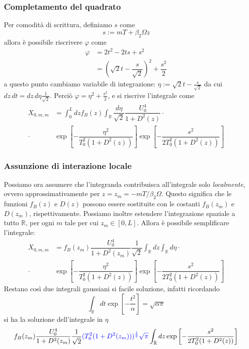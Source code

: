 \documentclass[8pt]{beamer} %
\begin{document}
\begin{frame}
	\frametitle{Completamento del quadrato}
	Per comodità di scrittura, definiamo $s$ come
	\begin{equation*}
		s := mT+\beta_2\Omega z
	\end{equation*}
	allora è possibile riscrivere $\varphi$ come
	\begin{align*}
		\varphi &= 2t^2 - 2ts + s^2 \\
		&= \left(\sqrt{2}t - \dfrac{s}{\sqrt{2}}\right)^2 + \dfrac{s^2}{2}
	\end{align*}
	a questo punto cambiamo variabile di integrazione: $\eta := \sqrt{2}t - \frac{s}{\sqrt{2}}$
	da cui $dz\,dt = dz\,d\eta \frac{1}{\sqrt{2}}$.
	Perciò $\varphi = \eta^2 + \frac{s^2}{2}$, e si riscrive l'integrale come
	\begin{align*}
		X_{0, m, m} &= \int_{0}^{L}dz f_B(z) \int_{\mathbb{R}}\dfrac{d\eta}{\sqrt{2}}
		\dfrac{U_0^4}{1+D^2(z)} \cdot \\ \cdot  &\exp\left[-\dfrac{\eta^2}{T_0^2(1+D^2(z))} \right] \exp\left[-\dfrac{s^2}{2T_0^2(1+D^2(z))} \right]
	\end{align*}
\end{frame}

\begin{frame}
	\frametitle{Assunzione di interazione locale}
	Possiamo ora assumere che l'integranda contribuisca all'integrale solo \emph{localmente}, ovvero approssimativamente per $z=z_m=-mT/\beta_2\Omega$. Questo significa che le funzioni $f_B(z)$ e $D(z)$ possono essere sostituite con le costanti $f_B(z_m)$ e $D(z_m)$, rispettivamente. Possiamo inoltre estendere l'integrazione spaziale a tutto $\mathbb{R}$, per ogni $m$ tale per cui $z_m \in [0, L]$.
	Allora è possibile semplificare l'integrale:
	\begin{align*}
		X_{0, m, m} &= f_B(z_m) \dfrac{U_0^4}{1+D^2(z_m)}  \dfrac{1}{\sqrt{2}}\int_{\mathbb{R}}dz \int_{\mathbb{R}}d\eta
	 \cdot \\ \cdot  &\exp\left[-\dfrac{\eta^2}{T_0^2(1+D^2(z))} \right] \exp\left[-\dfrac{s^2}{2T_0^2(1+D^2(z))} \right]
	\end{align*}
	Restano così due integrali gaussiani si facile soluzione, infatti ricordando 
	\begin{equation}
		\int_{\mathbb{R}}dt \exp\left[-\dfrac{t^2}{\alpha}\right] = \sqrt{\alpha \pi} 
	\end{equation}
	si ha la soluzione dell'integrale in $\eta$
	\begin{equation}
		f_B(z_m) \dfrac{U_0^4}{1+D^2(z_m)}  \dfrac{1}{\sqrt{2}}  {\color{blue}(T_0^2(1+D^2(z_m)))^{\frac{1}{2}}\sqrt{\pi}} \int_{\mathbb{R}}dz   \exp\left[-\dfrac{s^2}{2T_0^2(1+D^2(z))} \right]
\end{equation}
	
\end{frame}
\end{document}
